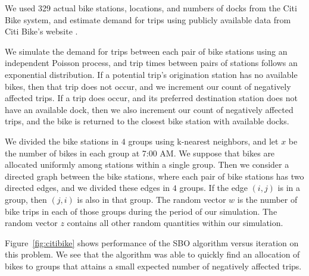 \documentclass{article} %
\newcommand{\w}{w}
\newcommand{\z}{z}
\begin{document}
We used 329 actual bike stations, locations, and numbers of docks from the Citi Bike system, and estimate demand for trips using publicly available data from Citi Bike's website \cite{citibike}.

We simulate the demand for trips between each pair of bike stations using an independent Poisson process, and trip times between pairs of stations follows an exponential distribution. 
If a potential trip's origination station has no available bikes, then that trip does not occur, and we increment our count of negatively affected trips.  If a trip does occur, and its preferred destination station does not have an available dock, then we also increment our count of negatively affected trips, and the bike is returned to the closest bike station with available docks.

We divided the bike stations in $4$ groups using k-nearest neighbors, and let $x$ be the number of bikes in each group at 7:00 AM. We suppose that bikes are allocated uniformly among stations within a single group.  Then we consider a directed graph between the bike stations, where each pair of bike stations has two directed edges, and we divided these edges in $4$ groups. If the edge $(i,j)$ is in a group, then $(j,i)$ is also in that group. The random vector $\w$ is the number of bike trips in each of those groups during the period of our simulation. The random vector $\z$ contains all other random quantities within our simulation.

Figure~\ref{fig:citibike} shows performance of the SBO algorithm versus iteration on this problem.  We see that the algorithm was able to quickly find an allocation of bikes to groups that attains a small expected number of negatively affected trips.


\end{document}

